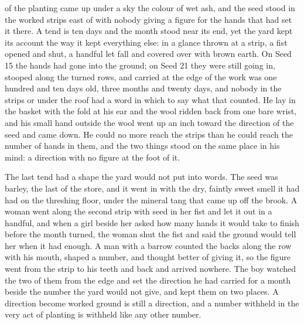 
 of the planting came up under a sky the colour of wet ash, and the seed stood in the worked strips east of  with nobody giving a figure for the hands that had set it there. A tend is ten days and the month stood near its end, yet the yard kept its account the way it kept everything else: in a glance thrown at a strip, a fist opened and shut, a handful let fall and covered over with brown earth. On Seed 15 the hands had gone into the ground; on Seed 21 they were still going in, stooped along the turned rows, and  carried at the edge of the work was one hundred and ten days old, three months and twenty days, and nobody in the strips or under the roof had a word in which to say what that counted. He lay in the basket with the fold at his ear and the wool ridden back from one bare wrist, and his small hand outside the wool went up an inch toward the direction of the seed and came down. He could no more reach the strips than he could reach the number of hands in them, and the two things stood on the same place in his mind: a direction with no figure at the foot of it.

The last tend had a shape the yard would not put into words. The seed was barley, the last of the store, and it went in with the dry, faintly sweet smell it had had on the threshing floor, under the mineral tang that came up off the brook. A woman went along the second strip with seed in her fist and let it out in a handful, and when a girl beside her asked how many hands it would take to finish before the month turned, the woman shut the fist and said the ground would tell her when it had enough. A man with a barrow counted the backs along the row with his mouth, shaped a number, and thought better of giving it, so the figure went from the strip to his teeth and back and arrived nowhere. The boy watched the two of them from the edge and set the direction he had carried for a month beside the number the yard would not give, and kept them on two places. A direction become worked ground is still a direction, and a number withheld in the very act of planting is withheld like any other number.

